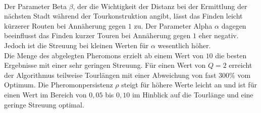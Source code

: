 \documentclass[doktyp=barbeit, sprache=german]{TUBAFarbeiten}
\begin{document}
\\Der Parameter Beta $\beta$, der die Wichtigkeit der Distanz bei der Ermittlung der nächsten Stadt während der Tourkonstruktion angibt, 
lässt das Finden leicht kürzerer Routen bei Annäherung gegen $1$ zu. Der Parameter Alpha $\alpha$ dagegen beeinflusst das Finden kurzer Touren bei Annäherung gegen $1$ eher negativ. Jedoch ist die Streuung bei kleinen Werten für $\alpha$ wesentlich höher. 
\\Die Menge des abgelegten Pheromons erzielt ab einem Wert von $10$ die besten Ergebnisse mit einer sehr geringen Streuung. Für einen Wert von $Q = 2$ erreicht der Algorithmus teilweise Tourlängen mit einer Abweichung von fast $300 \%$ vom Optimum. Die Pheromonpersistenz $\rho$ steigt für höhere Werte leicht an und ist für einen Wert im Bereich von $0,05$ bis $0,10$ im Hinblick auf die Tourlänge und eine geringe Streuung optimal.
\end{document}
